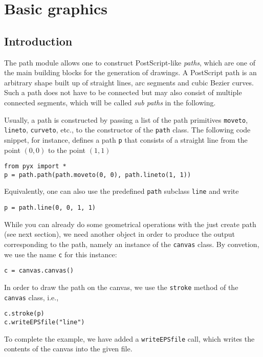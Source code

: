 \chapter{Basic graphics}


\label{path}

\section{Introduction}

The path module allows one to construct PostScript-like
\textit{paths}, which are one of the main building blocks for the
generation of drawings. A PostScript path is an arbitrary shape built
up of straight lines, arc segments and cubic Bezier curves. Such a
path does not have to be connected but may also consist of multiple
connected segments, which will be called \textit{sub paths} in the
following.

Usually, a path is constructed by passing a list of the path
primitives \verb|moveto|, \verb|lineto|, \verb|curveto|, etc., to the
constructor of the \verb|path| class. The following code snippet, for
instance, defines a path \verb|p| that consists of a straight line
from the point $(0, 0)$ to the point $(1, 1)$
\begin{verbatim}
from pyx import *
p = path.path(path.moveto(0, 0), path.lineto(1, 1))
\end{verbatim}
Equivalently, one can also use the predefined \verb|path| subclass
\verb|line| and write
\begin{verbatim}
p = path.line(0, 0, 1, 1)
\end{verbatim}

While you can already do some geometrical operations with the
just create path (see next section), we need another \PyX{} object
in order to produce the output corresponding to the path, namely
an instance of the \verb|canvas| class. By convetion, we use
the name \verb|c| for this instance:
\begin{verbatim}
c = canvas.canvas()
\end{verbatim}
In order to draw the path on the canvas, we use the \verb|stroke| method
of the \verb|canvas| class, i.e.,
\begin{verbatim}
c.stroke(p)
c.writeEPSfile("line")
\end{verbatim}
To complete the example, we have added a \verb|writeEPSfile| call,
which writes the contents of the canvas into the given file.

